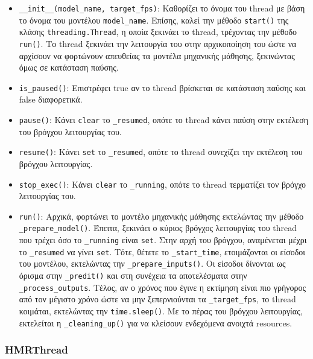 \begin{itemize}
	\item \texttt{\_\_init\_\_(model\_name, target\_fps)}: Καθορίζει το όνομα του thread με βάση το όνομα του μοντέλου \texttt{model\_name}. Επίσης, καλεί την μέθοδο \texttt{start()} της κλάσης \texttt{threading.Thread}, η οποία ξεκινάει το thread, τρέχοντας την μέθοδο \texttt{run()}. Το thread ξεκινάει την λειτουργία του στην αρχικοποίηση του ώστε να αρχίσουν να φορτώνουν απευθείας τα μοντέλα μηχανικής μάθησης, ξεκινώντας όμως σε κατάσταση παύσης.
	\item \texttt{is\_paused()}: Επιστρέφει true αν το thread βρίσκεται σε κατάσταση παύσης και false διαφορετικά.
	\item \texttt{pause()}: Κάνει \texttt{clear} το \texttt{\_resumed}, οπότε το thread κάνει παύση στην εκτέλεση του βρόγχου λειτουργίας του.
	\item \texttt{resume()}: Κάνει \texttt{set} το \texttt{\_resumed}, οπότε το thread συνεχίζει την εκτέλεση του βρόγχου λειτουργίας.
	\item \texttt{stop\_exec()}: Κάνει \texttt{clear} το \texttt{\_running}, οπότε το thread τερματίζει τον βρόγχο λειτουργίας του.
	\item \texttt{run()}: Αρχικά, φορτώνει το μοντέλο μηχανικής μάθησης εκτελώντας την μέθοδο \texttt{\_prepare\_model()}. Έπειτα, ξεκινάει ο κύριος βρόγχος λειτουργίας του thread που τρέχει όσο το \texttt{\_running} είναι \texttt{set}. Στην αρχή του βρόγχου, αναμένεται μέχρι το \texttt{\_resumed} να γίνει \texttt{set}. Τότε, θέτετε το \texttt{\_start\_time}, ετοιμάζονται οι είσοδοι του μοντέλου, εκτελώντας την \texttt{\_prepare\_inputs()}. Οι είσοδοι δίνονται ως όρισμα στην \texttt{\_predit()} και στη συνέχεια τα αποτελέσματα στην \texttt{\_process\_outputs}. Τέλος, αν ο χρόνος που έγινε η εκτίμηση είναι πιο γρήγορος από τον μέγιστο χρόνο ώστε να μην ξεπερνιούνται τα \texttt{\_target\_fps}, το thread κοιμάται, εκτελώντας την \texttt{time.sleep()}. Με το πέρας του βρόγχου λειτουργίας, εκτελείται η \texttt{\_cleaning\_up()} για να κλείσουν ενδεχόμενα ανοιχτά resources. 
\end{itemize}

\newpage
\subsubsection{HMRThread}
\label{sec:hmr_thread}

